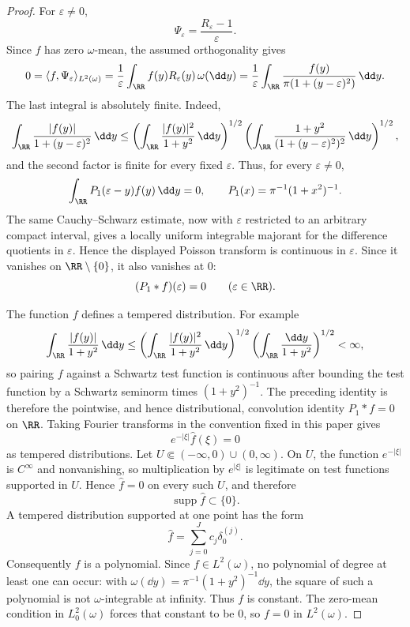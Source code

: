 \begin{proof}
For \(\varepsilon\ne0\),
\[
\Psi_\varepsilon=\frac{R_\varepsilon-1}{\varepsilon}.
\]
Since \(f\) has zero \(\omega\)-mean, the assumed orthogonality gives
\[
0=\langle f,\Psi_\varepsilon\rangle_{L^2(\omega)}
=\frac1{\varepsilon}\int_{\RR}f(y)R_\varepsilon(y)\,\omega(\dd y)
=\frac1{\varepsilon}\int_{\RR}
\frac{f(y)}{\pi(1+(y-\varepsilon)^2)}\,\dd y .
\]
The last integral is absolutely finite.  Indeed,
\[
\int_{\RR}\frac{|f(y)|}{1+(y-\varepsilon)^2}\,\dd y
\le
\left(\int_{\RR}\frac{|f(y)|^2}{1+y^2}\,\dd y\right)^{1/2}
\left(\int_{\RR}
\frac{1+y^2}{(1+(y-\varepsilon)^2)^2}\,\dd y\right)^{1/2},
\]
and the second factor is finite for every fixed \(\varepsilon\).  Thus, for
every \(\varepsilon\ne0\),
\[
\int_{\RR}P_1(\varepsilon-y)f(y)\,\dd y=0,
\qquad
P_1(x)=\pi^{-1}(1+x^2)^{-1}.
\]
The same Cauchy--Schwarz estimate, now with \(\varepsilon\) restricted to an
arbitrary compact interval, gives a locally uniform integrable majorant for
the difference quotients in \(\varepsilon\).  Hence the displayed Poisson
transform is continuous in \(\varepsilon\).  Since it vanishes on
\(\RR\setminus\{0\}\), it also vanishes at \(0\):
\[
(P_1*f)(\varepsilon)=0\qquad(\varepsilon\in\RR).
\]

The function \(f\) defines a tempered distribution.  For example
\[
\int_{\RR}\frac{|f(y)|}{1+y^2}\,\dd y
\le
\left(\int_{\RR}\frac{|f(y)|^2}{1+y^2}\,\dd y\right)^{1/2}
\left(\int_{\RR}\frac{\dd y}{1+y^2}\right)^{1/2}<\infty,
\]
so pairing \(f\) against a Schwartz test function is continuous after
bounding the test function by a Schwartz seminorm times \((1+y^2)^{-1}\).
The preceding identity is therefore the pointwise, and hence
distributional, convolution identity \(P_1*f=0\) on \(\RR\).
Taking Fourier transforms in the convention fixed in this paper gives
\[
e^{-|\xi|}\widehat f(\xi)=0
\]
as tempered distributions.  Let
\(U\Subset(-\infty,0)\cup(0,\infty)\).  On \(U\), the function
\(e^{-|\xi|}\) is \(C^\infty\) and nonvanishing, so multiplication by
\(e^{|\xi|}\) is legitimate on test functions supported in \(U\).  Hence
\(\widehat f=0\) on every such \(U\), and therefore
\[
\operatorname{supp}\widehat f\subset\{0\}.
\]
A tempered distribution supported at one point has the form
\[
\widehat f=\sum_{j=0}^{J}c_j\delta_0^{(j)} .
\]
Consequently \(f\) is a polynomial.  Since
\(f\in L^2(\omega)\), no polynomial of degree at least one can occur:
with \(\omega(\dd y)=\pi^{-1}(1+y^2)^{-1}\dd y\), the square of such a
polynomial is not \(\omega\)-integrable at infinity.  Thus \(f\) is
constant.  The zero-mean condition in \(L^2_0(\omega)\) forces that
constant to be \(0\), so \(f=0\) in \(L^2(\omega)\).
\end{proof}
\fi

